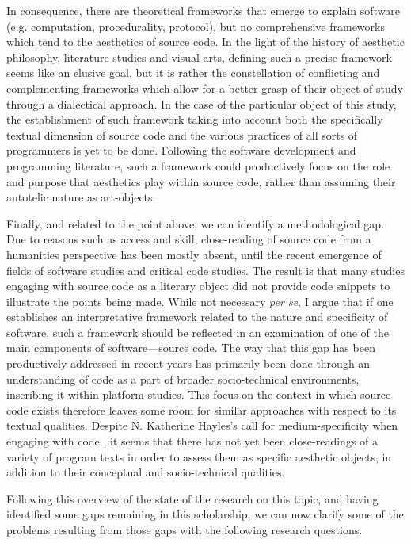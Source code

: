 In consequence, there are theoretical frameworks that emerge to explain software (e.g. computation, procedurality, protocol), but no comprehensive frameworks which tend to the aesthetics of source code. In the light of the history of aesthetic philosophy, literature studies and visual arts, defining such a precise framework seems like an elusive goal, but it is rather the constellation of conflicting and complementing frameworks which allow for a better grasp of their object of study through a dialectical approach. In the case of the particular object of this study, the establishment of such framework taking into account both the specifically textual dimension of source code and the various practices of all sorts of programmers is yet to be done. Following the software development and programming literature, such a framework could productively focus on the role and purpose that aesthetics play within source code, rather than assuming their autotelic nature as art-objects.

Finally, and related to the point above, we can identify a methodological gap. Due to reasons such as access and skill, close-reading of source code from a humanities perspective has been mostly absent, until the recent emergence of fields of software studies and critical code studies. The result is that many studies engaging with source code as a literary object did not provide code snippets to illustrate the points being made. While not necessary \emph{per se}, I argue that if one establishes an interpretative framework related to the nature and specificity of software, such a framework should be reflected in an examination of one of the main components of software—source code. The way that this gap has been productively addressed in recent years has primarily been done through an understanding of code as a part of broader socio-technical environments, inscribing it within platform studies. This focus on the context in which source code exists therefore leaves some room for similar approaches with respect to its textual qualities. Despite N. Katherine Hayles's call for medium-specificity when engaging with code \citep{hayles_print_2004}, it seems that there has not yet been close-readings of a variety of program texts in order to assess them as specific aesthetic objects, in addition to their conceptual and socio-technical qualities.

Following this overview of the state of the research on this topic, and having identified some gaps remaining in this scholarship, we can now clarify some of the problems resulting from those gaps with the following research questions.


